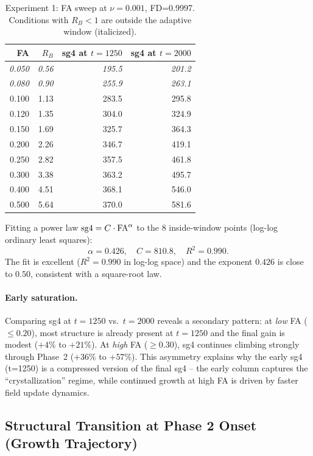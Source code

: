 \documentclass[11pt]{article}
\begin{document}
\begin{table}[ht]
\centering
\caption{Experiment 1: FA sweep at $\nu=0.001$, FD=0.9997.
Conditions with $R_B < 1$ are outside the adaptive window (italicized).}
\label{tab:exp1}
\begin{tabular}{rrrr}
\toprule
FA & $R_B$ & sg4 at $t=1250$ & sg4 at $t=2000$ \\
\midrule
\textit{0.050} & \textit{0.56} & \textit{195.5} & \textit{201.2} \\
\textit{0.080} & \textit{0.90} & \textit{255.9} & \textit{263.1} \\
0.100 & 1.13 & 283.5 & 295.8 \\
0.120 & 1.35 & 304.0 & 324.9 \\
0.150 & 1.69 & 325.7 & 364.3 \\
0.200 & 2.26 & 346.7 & 419.1 \\
0.250 & 2.82 & 357.5 & 461.8 \\
0.300 & 3.38 & 363.2 & 495.7 \\
0.400 & 4.51 & 368.1 & 546.0 \\
0.500 & 5.64 & 370.0 & 581.6 \\
\bottomrule
\end{tabular}
\end{table}

Fitting a power law ${\rm sg4} = C \cdot {\rm FA}^{\alpha}$ to the
8 inside-window points (log-log ordinary least squares):
\begin{equation}
\alpha = 0.426, \quad C = 810.8, \quad R^2 = 0.990.
\end{equation}
The fit is excellent ($R^2 = 0.990$ in log-log space) and the exponent
$0.426$ is close to $0.50$, consistent with a square-root law.

\paragraph{Early saturation.}
Comparing sg4 at $t=1250$ vs.\ $t=2000$ reveals a secondary pattern:
at \emph{low} FA ($\leq 0.20$), most structure is already present at $t=1250$
and the final gain is modest ($+4\%$ to $+21\%$).
At \emph{high} FA ($\geq 0.30$), sg4 continues climbing strongly through Phase~2
($+36\%$ to $+57\%$).
This asymmetry explains why the early sg4 (t=1250) is a compressed version
of the final sg4 -- the early column captures the ``crystallization'' regime,
while continued growth at high FA is driven by faster field update dynamics.

\subsection{Structural Transition at Phase 2 Onset (Growth Trajectory)}
\end{document}
